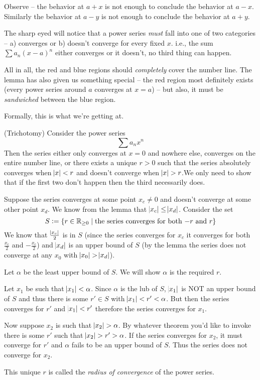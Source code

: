 Observe -- the behavior at $a + x$ is not enough to conclude the behavior at $a - x$. Similarly the behavior at $a - y$ is not enough to conclude the behavior at $a + y$.

The sharp eyed will notice that a power series \textit{must} fall into one of two categories -- a) converges or b) doesn't converge for every fixed $x$. i.e., the sum $\sum a_n(x - a)^n$ either converges or it doesn't, no third thing can happen.

All in all, the red and blue regions should \textit{completely} cover the number line. The lemma has also given us something special -- the red region most definitely exists (every power series around $a$ converges at $x = a$) -- but also, it must be \textit{sandwiched} between the blue region.

Formally, this is what we're getting at.
\begin{SWP}{\thm}{(Trichotomy) Consider the power series
$$
\sum a_nx^n
$$Then the series either only converges at $x = 0$ and nowhere else, converges on the entire number line, or there exists a unique $r > 0$ such that the series absolutely converges when $\abs{x} < r$ and doesn't converge when $\abs{x} > r$.}We only need to show that if the first two don't happen then the third necessarily does.

Suppose the series converges at some point $x_c \neq 0$ and doesn't converge at some other point $x_d$. We know from the lemma that $\abs{x_c} \leq \abs{x_d}$. Consider the set
$$
S := \{r \in \mathbb{R}_{\geq 0} \space \mid \space \text{the series converges for both $-r$ and $r$}\}
$$
We know that $\frac{\abs{x_c}}{2}$ is in $S$ (since the series converges for $x_c$ it converges for both $\frac{x_c}{2}$ and $-\frac{x_c}{2}$) and $\abs{x_d}$ is an upper bound of $S$ (by the lemma the series does not converge at any $x_0$ with $\abs{x_0} > \abs{x_d}$).

Let $\alpha$ be the least upper bound of $S$. We will show $\alpha$ is the required $r$.

Let $x_1$ be such that $\abs{x_1} < \alpha$. Since $\alpha$ is the lub of $S$, $\abs{x_1}$ is NOT an upper bound of $S$ and thus there is some $r' \in S$ with $\abs{x_1} < r' < \alpha$. But then the series converges for $r'$ and $\abs{x_1} < r'$ therefore the series converges for $x_1$.

Now suppose $x_2$ is such that $\abs{x_2} > \alpha$. By whatever theorem you'd like to invoke there is some $r'$ such that $\abs{x_2} > r' > \alpha$. If the series converges for $x_2$, it must converge for $r'$ and $\alpha$ fails to be an upper bound of $S$. Thus the series does not converge for $x_2$.
\end{SWP}
This unique $r$ is called the \emph{radius of convergence} of the power series.

